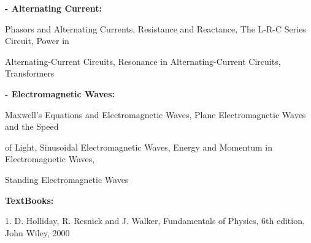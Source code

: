 \documentclass[12pt,a4paper]{article}
\begin{document}
\vspace{2pt}\textbf{- Alternating Current:}\par
Phasors and Alternating Currents, Resistance and Reactance, The L-R-C Series Circuit, Power in\par
Alternating-Current Circuits, Resonance in Alternating-Current Circuits, Transformers\par
\vspace{2pt}\textbf{- Electromagnetic Waves:}\par
Maxwell’s Equations and Electromagnetic Waves, Plane Electromagnetic Waves and the Speed\par
of Light, Sinusoidal Electromagnetic Waves, Energy and Momentum in Electromagnetic Waves,\par
Standing Electromagnetic Waves\par\vspace{4pt}
\textbf{TextBooks:}\par\vspace{2pt}
1. D. Holliday, R. Resnick and J. Walker, Fundamentals of Physics, 6th edition, John Wiley, 2000\par
\vspace{4pt}
\end{document}

